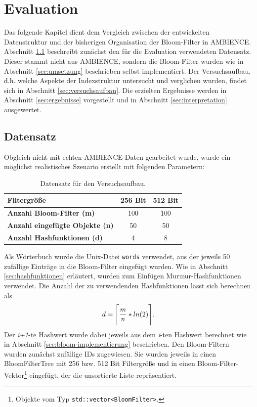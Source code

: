 \chapter{Evaluation}\label{ch:evaluation}
Das folgende Kapitel dient dem Vergleich zwischen der entwickelten Datenstruktur und der bisherigen Organisation der Bloom-Filter in AMBIENCE. Abschnitt \ref{sec:datensatz} beschreibt zunächst den für die Evaluation verwendeten Datensatz. Dieser stammt nicht aus AMBIENCE, sondern die Bloom-Filter wurden wie in Abschnitt \ref{sec:umsetzung} beschrieben selbst implementiert. Der Versuchsaufbau, d.h. welche Aspekte der Indexstruktur untersucht und verglichen wurden, findet sich in Abschnitt \ref{sec:versuchsaufbau}. Die erzielten Ergebnisse werden in Abschnitt \ref{sec:ergebnisse} vorgestellt und in Abschnitt \ref{sec:interpretation} ausgewertet.
\section{Datensatz}\label{sec:datensatz}
Obgleich nicht mit echten AMBIENCE-Daten gearbeitet wurde, wurde ein möglichst realistisches Szenario erstellt mit folgenden Parametern:
\begin{center}
\begin{table}[htbp]
{\small
\begin{center}
\begin{tabular}[center]{lcc}
\toprule
\textbf{Filtergröße} & 256 Bit & 512 Bit\\
\midrule
\textbf{Anzahl Bloom-Filter (m)} & 100 & 100\\
\midrule
\textbf{Anzahl eingefügte Objekte (n)} & 50 & 50\\
\midrule
\textbf{Anzahl Hashfunktionen (d)} & 4 & 8\\
\bottomrule
\end{tabular}
\end{center}
} %
\caption[Datensatz für den Versuchsaufbau]{Datensatz für den Versuchsaufbau.\label{tab:Datensatz}}
\end{table}
\end{center}
Als Wörterbuch wurde die Unix-Datei \texttt{words} verwendet, aus der jeweils 50 zufällige Einträge in die Bloom-Filter eingefügt wurden. Wie in Abschnitt \ref{sec:hashfunktionen} erläutert, wurden zum Einfügen Murmur-Hashfunktionen verwendet. Die Anzahl der zu verwendenden Hashfunktionen lässt sich berechnen als 
\[d = \Ceil[\Bigg]{\frac{m}{n} * ln(2)}.\]
\noindent
Der \textit{i+1}-te Hashwert wurde dabei jeweils aus dem \textit{i}-ten Hashwert berechnet wie in Abschnitt \ref{sec:bloom-implementierung} beschrieben. Den Bloom-Filtern wurden zunächst zufällige IDs zugewiesen. Sie wurden jeweils in einen BloomFilterTree mit 256 bzw. 512 Bit Filtergröße und in einen Bloom-Filter-Vektor\footnote{Objekte vom Typ \texttt{std::vector<BloomFilter>}.} eingefügt, der die unsortierte Liste repräsentiert.
\newpage
